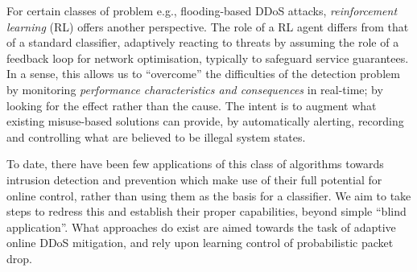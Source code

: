 \documentclass[conference, letterpaper, 10pt, times]{IEEEtran}
\begin{document}
For certain classes of problem e.g., flooding-based DDoS attacks, \emph{reinforcement learning} (RL) offers another perspective.
The role of a RL agent differs from that of a standard classifier, adaptively reacting to threats by assuming the role of a feedback loop for network optimisation, typically to safeguard service guarantees.
In a sense, this allows us to ``overcome'' the difficulties of the detection problem by monitoring \emph{performance characteristics and consequences} in real-time; by looking for the effect rather than the cause.
The intent is to augment what existing misuse-based solutions can provide, by automatically alerting, recording and controlling what are believed to be illegal system states.

To date, there have been few applications of this class of algorithms towards intrusion detection and prevention which make use of their full potential for online control, rather than using them as the basis for a classifier.
We aim to take steps to redress this and establish their proper capabilities, beyond simple ``blind application''.
What approaches do exist are aimed towards the task of adaptive online DDoS mitigation, and rely upon learning control of probabilistic packet drop.
\end{document}
